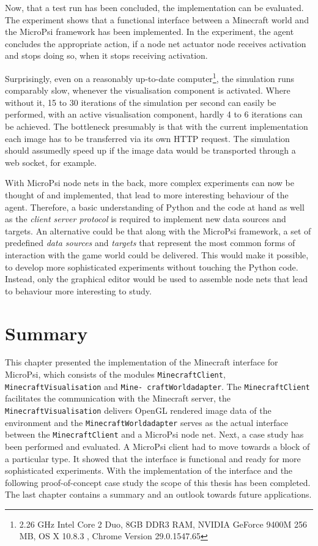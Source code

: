 Now, that a test run has been concluded, the implementation can be evaluated.
The experiment shows that a functional interface between a Minecraft world and the MicroPsi framework has been implemented. In the experiment, the agent concludes the appropriate action, if a node net actuator node receives activation and stops doing so, when it stops receiving activation.

Surprisingly, even on a reasonably up-to-date computer\footnote{2.26 GHz Intel Core 2 Duo, 8GB DDR3 RAM, NVIDIA GeForce 9400M 256 MB, OS X 10.8.3 , Chrome Version 29.0.1547.65}, the simulation runs comparably slow, whenever the visualisation component is activated. Where without it, 15 to 30 iterations of the simulation per second can easily be performed, with an active visualisation component, hardly 4 to 6 iterations can be achieved. The bottleneck presumably is that with the current implementation each image has to be transferred via its own HTTP request. The simulation should assumedly speed up if the image data would be transported through a web socket, for example.

With MicroPsi node nets in the back, more complex experiments can now be thought of and implemented, that lead to more interesting behaviour of the agent. Therefore, a basic understanding of Python and the code at hand as well as the \emph{client server protocol} is required to implement new data sources and targets. An alternative could be that along with the MicroPsi framework, a set of predefined \emph{data sources} and \emph{targets} that represent the most common forms of interaction with the game world could be delivered. This would make it possible, to develop more sophisticated experiments without touching the Python code. Instead, only the graphical editor would be used to assemble node nets that lead to behaviour more interesting to study.

    \section{Summary}
This chapter presented the implementation of the Minecraft interface for MicroPsi, which consists of the modules \texttt{MinecraftClient}, \texttt{MinecraftVisualisation} and \texttt{Mine- craftWorldadapter}. The \texttt{MinecraftClient} facilitates the communication with the Minecraft server, the \texttt{MinecraftVisualisation} delivers OpenGL rendered image data of the environment and the \texttt{MinecraftWorldadapter} serves as the actual interface between the \texttt{MinecraftClient} and a MicroPsi node net.
Next, a case study has been performed and evaluated. A MicroPsi client had to move towards a block of a particular type. It showed that the interface is functional and ready for more sophisticated experiments.
With the implementation of the interface and the following proof-of-concept case study the scope of this thesis has been completed. The last chapter contains a summary and an outlook towards future applications.